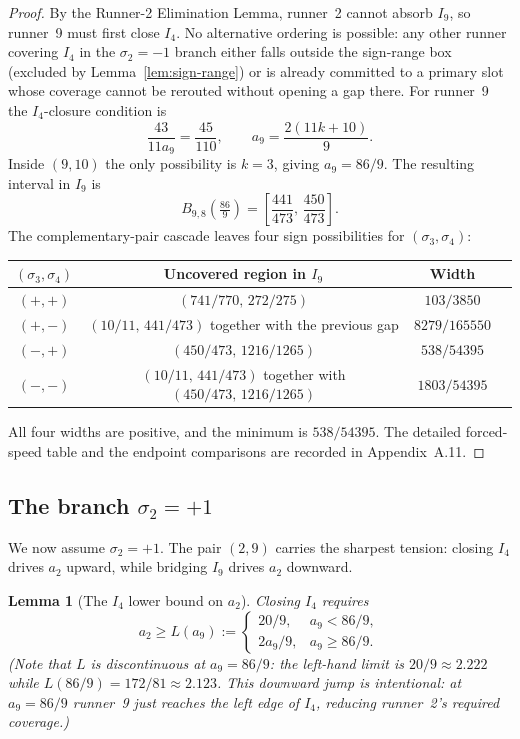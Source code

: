 \documentclass[12pt,a4paper]{amsart}
\newtheorem{lemma}[theorem]{Lemma}
\theoremstyle{definition}
\theoremstyle{remark}
\begin{document}
\begin{proof}
By the Runner-2 Elimination Lemma, runner~2 cannot absorb $I_9$, so runner~9 must first
close $I_4$. No alternative ordering is possible: any other runner covering $I_4$ in the
$\sigma_2=-1$ branch either falls outside the sign-range box (excluded by
Lemma~\ref{lem:sign-range}) or is already committed to a primary slot whose coverage
cannot be rerouted without opening a gap there. For runner~9 the $I_4$-closure condition is
\[
  \frac{43}{11a_9} = \frac{45}{110},\qquad a_9 = \frac{2(11k+10)}{9}.
\]
Inside $(9,10)$ the only possibility is $k=3$, giving $a_9=86/9$. The resulting interval
in $I_9$ is
\[
  B_{9,8}\!\left(\tfrac{86}{9}\right)
  = \left[\frac{441}{473},\,\frac{450}{473}\right].
\]
The complementary-pair cascade leaves four sign possibilities for $(\sigma_3,\sigma_4)$:

\medskip
\begin{center}
\begin{tabular}{cccc}
\toprule
$(\sigma_3,\sigma_4)$ & Uncovered region in $I_9$ & Width \\
\midrule
$(+,+)$ & $(741/770,\,272/275)$ & $103/3850$ \\
$(+,-)$ & $(10/11,\,441/473)$ together with the previous gap & $8279/165550$ \\
$(-,+)$ & $(450/473,\,1216/1265)$ & $538/54395$ \\
$(-,-)$ & $(10/11,\,441/473)$ together with $(450/473,\,1216/1265)$ & $1803/54395$ \\
\bottomrule
\end{tabular}
\end{center}

\medskip\noindent
All four widths are positive, and the minimum is $538/54395$. The detailed forced-speed
table and the endpoint comparisons are recorded in Appendix~A.11.
\end{proof}

\subsection{The branch \texorpdfstring{$\sigma_2=+1$}{sigma2 = +1}}

We now assume $\sigma_2=+1$. The pair $(2,9)$ carries the sharpest tension: closing $I_4$
drives $a_2$ upward, while bridging $I_9$ drives $a_2$ downward.

\begin{lemma}[The $I_4$ lower bound on $a_2$]\label{lem:i4lower}
Closing $I_4$ requires
\[
  a_2 \ge L(a_9) :=
  \begin{cases}
    20/9, & a_9 < 86/9,\\[2pt]
    2a_9/9, & a_9 \ge 86/9.
  \end{cases}
\]
(Note that $L$ is discontinuous at $a_9=86/9$: the left-hand limit is $20/9\approx 2.222$
while $L(86/9)=172/81\approx 2.123$. This downward jump is intentional: at $a_9=86/9$
runner~9 just reaches the left edge of $I_4$, reducing runner~2's required coverage.)
\end{lemma}
\end{document}
